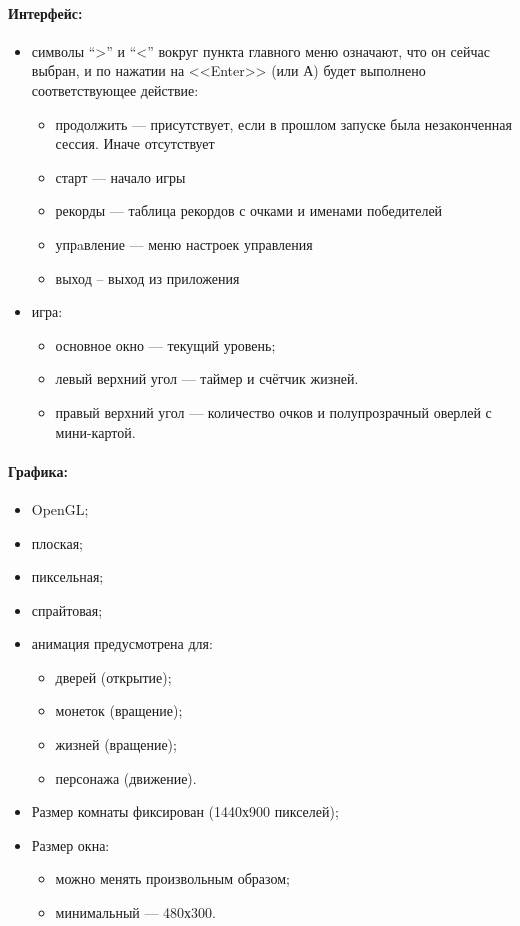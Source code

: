 \documentclass[12pt,a4paper,fullpage,titlepage]{article}
\begin{document}
\paragraph{Интерфейс:}
\begin{itemize}
	\item символы ``>'' и ``<'' вокруг пункта главного меню означают, что он сейчас выбран, и по нажатии на <<Enter>> (или А) будет выполнено соответствующее действие:
	\begin{itemize}
		\item продолжить --- присутствует, если в прошлом запуске была незаконченная сессия. Иначе отсутствует
		\item старт --- начало игры
		\item рекорды --- таблица рекордов с очками и именами победителей
		\item упрaвление --- меню настроек управления
		\item выход -- выход из приложения\\
	\end{itemize}
	\item игра:	
	\begin{itemize}
		\item основное окно --- текущий уровень;
		\item левый верхний угол --- таймер и счётчик жизней. 
		\item правый верхний угол --- количество очков и полупрозрачный оверлей с мини-картой.
	\end{itemize}
\end{itemize}

\paragraph{Графика:}
\begin{itemize}
	\item OpenGL;
	\item плоская;
	\item пиксельная;
	\item спрайтовая;
	\item анимация предусмотрена для:
	\begin{itemize}
		\item дверей (открытие);
		\item монеток (вращение);
		\item жизней (вращение);
		\item персонажа (движение).
	\end{itemize}
	\item Размер комнаты фиксирован (1440х900 пикселей);
	\item Размер окна:
	\begin{itemize}
		\item можно менять произвольным образом;
		\item минимальный --- 480х300.
	\end{itemize}
\end{itemize}
\end{document}
